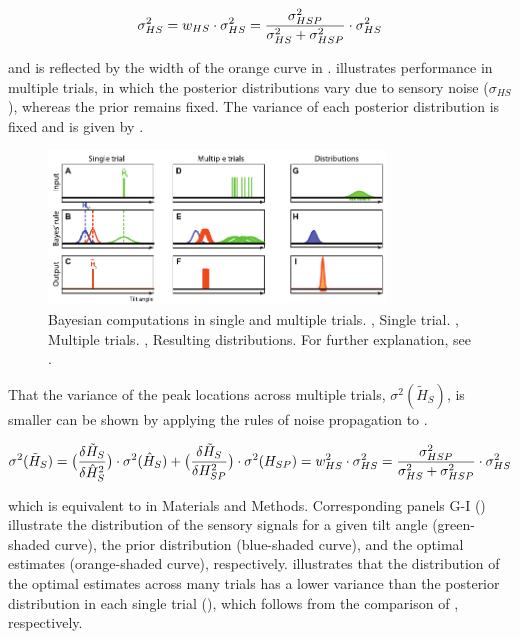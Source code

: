 \begin{equation}
\label{p1:eqn16}
\sigma^2_{HS} = w_{HS} \cdot \sigma^2_{HS} \\
              = \frac{\sigma^2_{HSP}}{\sigma^2_{HS} + \sigma^2_{HSP}} \cdot \sigma^2_{HS}
\end{equation}

and is reflected by the width of the orange curve in .  illustrates performance in multiple trials, in which the posterior distributions vary due to sensory noise ($\sigma_{HS}$), whereas the prior remains fixed. The variance of each posterior distribution is fixed and is given by . 

\begin{figure}
    \includegraphics[width=0.80\textwidth]{src/paper1/figure8.pdf}
    \caption{Bayesian computations in single and multiple trials. , Single trial. , Multiple trials. , Resulting distributions. For further explanation, see .}
    \label{p1:fig8}
\end{figure}

That the variance of the peak locations across multiple trials, $\sigma^2(\tilde{H}_S)$, is smaller can be shown by applying the rules of noise propagation to . 

\begin{equation}
\label{p1:eqn17}
\sigma^2(\tilde{H}_S) = \\
	\big( \frac{\delta\tilde{H}_S}{\delta\hat{H}_S^2} \big) \cdot \\
	\sigma^2(\hat{H}_S) + \\
	\big( \frac{\delta\tilde{H}_S}{\delta H_{SP}^2} \big) \cdot \\
	\sigma^2(H_{SP}) \\
	= w^2_{HS} \cdot \sigma^2_{HS} \\
	= \frac{\sigma^2_{HSP}}{\sigma^2_{HS} + \sigma^2_{HSP}} \cdot \sigma^2_{HS}
\end{equation}

which is equivalent to  in Materials and Methods. Corresponding panels G-I () illustrate the distribution of the sensory signals for a given tilt angle (green-shaded curve), the prior distribution (blue-shaded curve), and the optimal estimates (orange-shaded curve), respectively.  illustrates that the distribution of the optimal estimates across many trials has a lower variance than the posterior distribution in each single trial (), which follows from the comparison of , respectively. 

